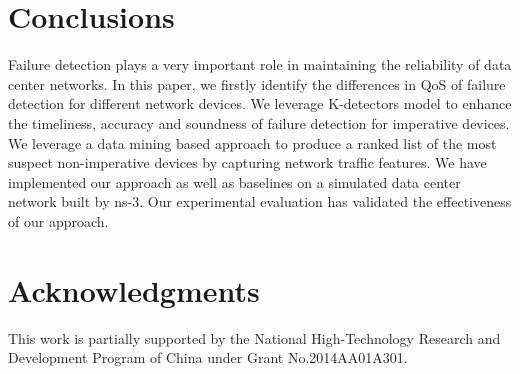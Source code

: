 \documentclass{sig-alternate-05-2015}
\begin{document}
\section{Conclusions}
Failure detection plays a very important role in maintaining the reliability of data center networks. In this paper, we firstly identify the differences in QoS of failure detection for different network devices. We leverage K-detectors model to enhance the timeliness, accuracy and soundness of failure detection for imperative devices. We leverage a data mining based approach to produce a ranked list of the most suspect non-imperative devices by capturing network traffic features. We have implemented our approach as well as baselines on a simulated data center network built by ns-3. Our experimental evaluation has validated the effectiveness of our approach.


\section{Acknowledgments}
This work is partially supported by the National High-Technology Research and Development Program of China under Grant No.2014AA01A301.




\end{document}

